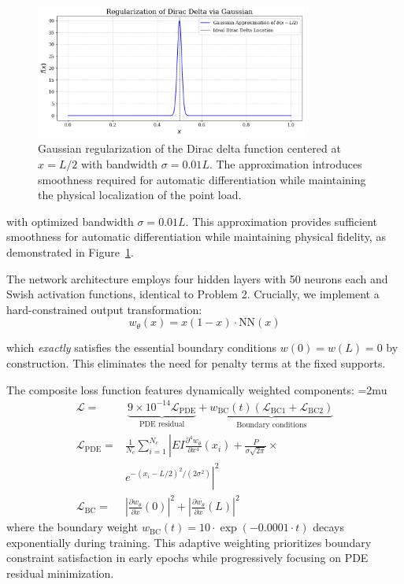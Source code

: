 \documentclass[twocolumn]{svjour3}
\begin{document}
	\begin{figure}[htbp]
		\centering
		\includegraphics[width=0.8\textwidth]{figure_delta_regularization.png}
		\caption{Gaussian regularization of the Dirac delta function centered at $x = L/2$ with bandwidth $\sigma = 0.01L$. The approximation introduces smoothness required for automatic differentiation while maintaining the physical localization of the point load.}\label{fig:delta_approximation}
	\end{figure}
	
	with optimized bandwidth $\sigma = 0.01L$. This approximation provides sufficient smoothness for automatic differentiation while maintaining physical fidelity, as demonstrated in Figure~\ref{fig:delta_approximation}.
	
	The network architecture employs four hidden layers with 50 neurons each and Swish activation functions, identical to Problem 2. Crucially, we implement a hard-constrained output transformation:
	\begin{equation}
	w_{\theta}(x) = x(1-x) \cdot \text{NN}(x)
	\label{eq:121}
	\end{equation}

	which \textit{exactly} satisfies the essential boundary conditions $w(0) = w(L) = 0$ by construction. This eliminates the need for penalty terms at the fixed supports.
	
	The composite loss function features dynamically weighted components:
	{\medmuskip=2mu
	\begin{align}
	    \mathcal{L} = &\: \underbrace{9 \times 10^{-14} \mathcal{L}_{\text{PDE}}}_{\text{PDE residual}} + \underbrace{w_{\text{BC}}(t) \left( \mathcal{L}_{\text{BC1}} + \mathcal{L}_{\text{BC2}} \right)}_{\text{Boundary conditions}} \\
	    \mathcal{L}_{\text{PDE}} = &\frac{1}{N_c} \sum_{i=1}^{N_c} \left|EI \frac{\partial^4 w_\theta}{\partial x^4}(x_i) + \frac{P}{\sigma\sqrt{2\pi}} \times \right. \nonumber \\
	    &\left. e^{-(x_i-L/2)^2/(2\sigma^2)} \right|^2 \\
	    \mathcal{L}_{\text{BC}} = &\left|\frac{\partial w_\theta}{\partial x}(0)\right|^2 + \left|\frac{\partial w_\theta}{\partial x}(L)\right|^2
	\end{align}
	}
	where the boundary weight $w_{\text{BC}}(t) = 10 \cdot \exp(-0.0001 \cdot t)$ decays exponentially during training. This adaptive weighting prioritizes boundary constraint satisfaction in early epochs while progressively focusing on PDE residual minimization.
	
\end{document}
